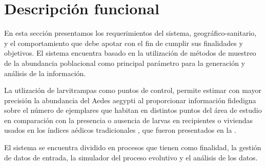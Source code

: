 \section{Descripción funcional}
En esta sección presentamos los requerimientos del sistema, geográfico-sanitario, y el
comportamiento que debe apotar con el fin de cumplir sus finalidades y objetivos. El sistema
encuentra basado en la utilización de métodos de muestreo de la abundancia poblacional como
principal parámetro para la generación y análisis de la información.

La utlización de larvitrampas como puntos de control, permite estimar con mayor precisión la
abundancia del Aedes aegypti al proporcionar información fidedigna sobre el número de ejemplares
que habitan en distintos puntos del área de estudio en comparación con la presencia o ausencia de
larvas en recipientes o viviendas usados en los índices aédicos tradicionales
\citet{NINO2011}, que fueron presentados en la .

El sistema se encuentra dividido en procesos que tienen como finalidad, la gestión de datos de
entrada, la simulador del proceso evolutivo y el análisis de los datos.




